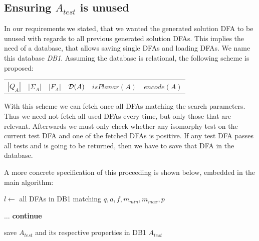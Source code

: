 \subsection{Ensuring $A_{test}$ is unused}

In our requirements we stated, that we wanted the generated solution DFA to be unused with regards to all previous generated solution DFAs. This implies the need of a database, that allows saving single DFAs and loading DFAs. We name this database \emph{DB1}. Assuming the database is relational, the following scheme is proposed:
\begin{center}
	\begin{tabular}{c c c c c c}
	$|Q_A|$ & |$\Sigma_A$| & $|F_A|$ & $\mathcal{D}(A)$ & $isPlanar(A)$ & $encode(A)$
	\end{tabular}
\end{center}
With this scheme we can fetch once all DFAs matching the search parameters. Thus we need not fetch all used DFAs every time, but only those that are relevant. Afterwards we must only check whether any isomorphy test on the current test DFA and one of the fetched DFAs is positive. If any test DFA passes all tests and is going to be returned, then we have to save that DFA in the database.

A more concrete specification of this proceeding is shown below, embedded in the main algorithm:
\vspace{0.2cm}
\begin{algorithmic}[1]
	
		\vspace{0.2cm}
	
		\State $l \gets$ all DFAs in DB1 matching $q, a, f, m_{min}, m_{max}, p$
		
		\vspace{0.2cm}
		
		
		\vspace{0.2cm}
		
			\State $\ldots$
				\State \textbf{continue}
			\EndIf
			
			\vspace{0.2cm}
			
			\State save $A_{test}$ and its respective properties in DB1
			\State\Return $A_{test}$
		\EndWhile
	\EndFunction
\end{algorithmic}
\vspace{0.2cm}

